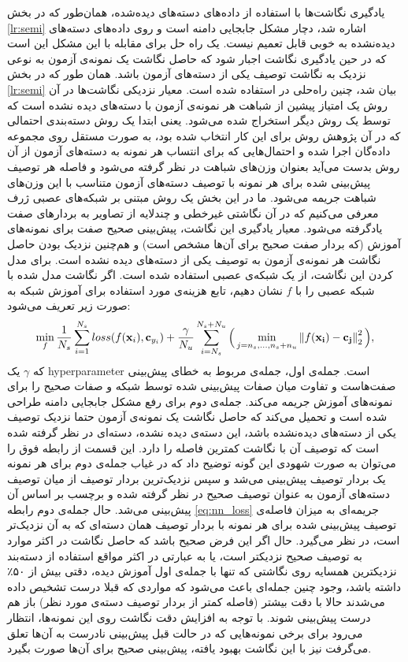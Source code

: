 یادگیری نگاشت‌ها با استفاده از داده‌های دسته‌های دیده‌شده، همان‌طور که در بخش \ref{lr:semi} اشاره شد، دچار مشکل جابجایی دامنه است و  روی داده‌های دسته‌های دیده‌نشده به خوبی قابل تعمیم نیست. یک راه حل برای مقابله با این مشکل این است که در حین یادگیری نگاشت اجبار شود که حاصل نگاشت یک نمونه‌ی آزمون به نوعی نزدیک به نگاشت توصیف یکی از دسته‌های آزمون باشد. همان ‌طور که در بخش
\ref{lr:semi}
بیان شد، چنین راه‌حلی در
\cite{Kodirov2015}
استفاده شده است. معیار نزدیکی نگاشت‌ها در آن روش یک امتیاز پیشین از شباهت هر نمونه‌ی آزمون با دسته‌های دیده نشده است که  توسط یک روش دیگر استخراج شده می‌شود. یعنی ابتدا یک روش دسته‌بندی
احتمالی  که در آن پژوهش روش  \cite{lampert09} برای این کار انتخاب شده بود، به صورت مستقل روی مجموعه داده‌گان اجرا شده و احتمال‌هایی که برای انتساب هر نمونه به دسته‌های آزمون از آن روش بدست می‌آید بعنوان وزن‌های شباهت در نظر گرفته می‌شود و فاصله هر توصیف پیش‌بینی شده برای هر نمونه با توصیف دسته‌های آزمون متناسب با این وزن‌های شباهت جریمه می‌شود.
 ما در این بخش یک روش مبتنی بر شبکه‌های عصبی ژرف معرفی می‌کنیم که در آن نگاشتی غیرخطی و چندلایه از تصاویر به بردارهای صفت یادگرفته می‌شود. معیار یادگیری این نگاشت، پیش‌بینی صحیح صفت برای نمونه‌های آموزش (که بردار صفت صحیح برای آن‌ها مشخص است) و هم‌چنین نزدیک بودن حاصل نگاشت هر نمونه‌ی آزمون به توصیف یکی از دسته‌های دیده نشده است. برای مدل کردن این نگاشت، از یک شبکه‌ی عصبی استفاده شده است. اگر نگاشت مدل شده با شبکه عصبی را با $f$ نشان دهیم، تابع هزینه‌ی مورد استفاده برای آموزش شبکه به صورت زیر تعریف می‌شود:
\begin{equation}
\label{eq:nn_loss}
\min_{f}
\frac{1}{N_s} \sum_{i=1}^{N_s} loss(f(\mathbf{x}_i), \mathbf{c}_{y_i}) +
\frac{\gamma}{N_u} \sum_{i=N_s}^{N_s+N_u} \Big ( \min_{j=n_s,\ldots,n_s + n_u} \left \lVert f(\mathbf{x_i) - c_j} \right \rVert_2^2 \Big ),
\end{equation}
که $\gamma$ یک \gls{hyperparameter} است.
جمله‌ی اول، جمله‌ی مربوط به خطای پیش‌بینی صفت‌هاست و تفاوت میان صفات پیش‌بینی شده توسط شبکه و صفات صحیح را برای نمونه‌های آموزش جریمه می‌کند.
 جمله‌ی دوم برای رفع مشکل جابجایی دامنه طراحی شده است و تحمیل می‌کند که حاصل نگاشت یک نمونه‌ی آزمون حتما نزدیک توصیف یکی از دسته‌های دیده‌نشده باشد، این دسته‌ی دیده نشده، دسته‌ای در نظر گرفته شده است که توصیف آن با نگاشت کمترین فاصله را دارد. این قسمت از رابطه فوق را می‌توان به صورت شهودی این گونه توضیح داد که در غیاب جمله‌ی دوم برای هر نمونه یک بردار توصیف پیش‌بینی می‌شد و سپس نزدیک‌ترین بردار توصیف از میان توصیف دسته‌های آزمون به عنوان توصیف صحیح در نظر گرفته شده و برچسب بر اساس آن پیش‌بینی می‌شد. حال جمله‌ی دوم رابطه \eqref{eq:nn_loss} جریمه‌ای به میزان فاصله‌ی توصیف پیش‌بینی شده برای هر نمونه با بردار توصیف همان دسته‌ای که به آن نزدیک‌تر است، در نظر می‌گیرد. حال اگر این فرض صحیح باشد که
 حاصل نگاشت در اکثر موارد به توصیف صحیح نزدیکتر است، یا به عبارتی در اکثر مواقع استفاده از دسته‌بند نزدیکترین همسایه روی نگاشتی که تنها با جمله‌ی اول آموزش دیده، دقتی بیش از ۵۰٪ داشته باشد، وجود چنین جمله‌ای باعث می‌شود که مواردی که قبلا درست تشخیص داده می‌شدند حالا با دقت بیشتر (فاصله کمتر از بردار توصیف دسته‌ی مورد نظر) باز هم درست پیش‌بینی شوند. با توجه به افزایش دقت نگاشت روی این نمونه‌ها، انتظار می‌رود برای برخی نمونه‌هایی که در حالت قبل پیش‌بینی نادرست به آن‌ها تعلق می‌گرفت نیز با این نگاشت بهبود یافته، پیش‌بینی صحیح برای آن‌ها صورت بگیرد.

